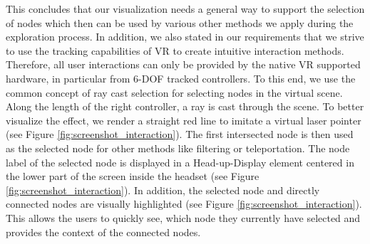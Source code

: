 This concludes that our visualization needs a general way to support the selection of nodes which then can be used by various other methods we apply during the exploration process. 
In addition, we also stated in our requirements that we strive to use the tracking capabilities of VR to create intuitive interaction methods.
Therefore, all user interactions can only be provided by the native VR supported hardware, in particular from 6-DOF tracked controllers. 
To this end, we use the common concept of ray cast selection for selecting nodes in the virtual scene. Along the length of the right controller, a ray is cast through the scene. 
To better visualize the effect, we render a straight red line to imitate a virtual laser pointer (see Figure \ref{fig:screenshot_interaction}). 
The first intersected node is then used as the selected node for other methods like filtering or teleportation. The node label of the selected node is displayed in a Head-up-Display element centered in the lower part of the screen inside the headset (see Figure \ref{fig:screenshot_interaction}). 
In addition, the selected node and directly connected nodes are visually highlighted (see Figure \ref{fig:screenshot_interaction}). This allows the users to quickly see, which node they currently have selected and provides the context of the connected nodes.

